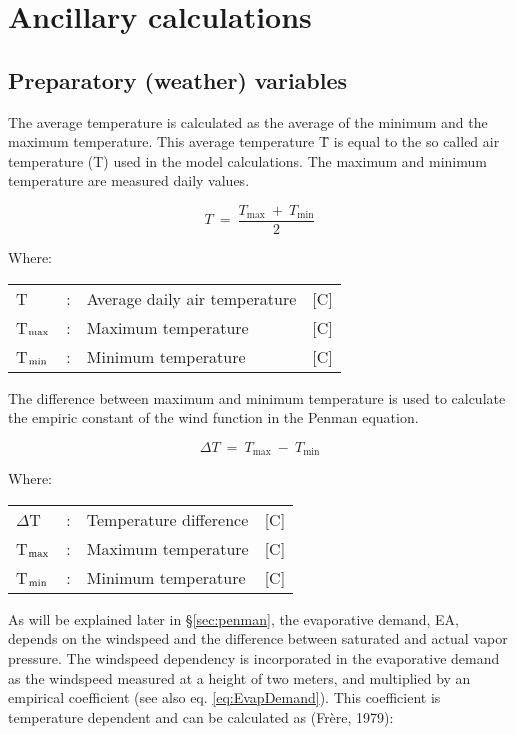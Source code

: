 \chapter{Ancillary calculations}


\section{Preparatory (weather) variables}


The average temperature is calculated as the average of the minimum and the maximum
temperature. This average temperature \={T} is equal to the so called air temperature (T) used
in the model calculations. The maximum and minimum temperature are measured daily
values.

\begin{equation}
T ~=~{\frac{T _{\max } ~+~ T _{\min } }{2}}
\end{equation}

Where:\\[5pt]
\begin{tabularx}{\textwidth}{llXr}
	T &:& Average daily air temperature & [\degrees C]\\
	T$_{{\rm max}}$&:  & Maximum temperature & [\degrees C]\\
	T$_{{\rm min}}$&: &  Minimum temperature & [\degrees C]\\
\end{tabularx}


The difference between maximum and minimum temperature is used to calculate the
empiric constant of the wind function in the Penman equation.

\begin{equation}
\Delta T ~= ~T _{\max } ~-~ T _{\min } 
\end{equation}

Where:\\[5pt]
\begin{tabularx}{\textwidth}{llXr}
	$\Delta$T& :& Temperature difference  &[\degrees C]\\
	T$_{{\rm max}}$ &:& Maximum temperature &  [\degrees C]\\
	T$_{{\rm min}}$& :& Minimum temperature  &[\degrees C]
\end{tabularx}


As will be explained later in \S \ref{sec:penman}, the evaporative demand, EA, depends on the 
windspeed and the difference between saturated and actual vapor pressure. The windspeed
dependency is incorporated in the evaporative demand as the windspeed measured at a
height of two meters, and multiplied by an empirical coefficient (see also eq. 
\ref{eq:EvapDemand}). This
coefficient is temperature dependent and can be calculated as (Fr\`{e}re, 1979):

